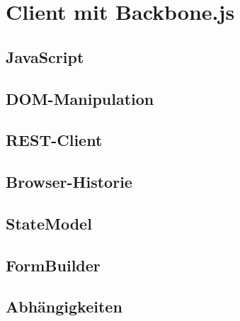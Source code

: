 \section[Client]{Client mit Backbone.js}


\subsection{JavaScript}


\subsection{DOM-Manipulation}


\subsection{REST-Client}


\subsection{Browser-Historie}


\subsection{StateModel}


\subsection{FormBuilder}


\subsection{Abhängigkeiten}


